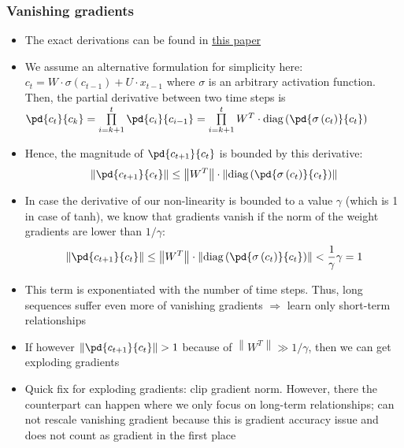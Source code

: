 \subsubsection{Vanishing gradients}
\begin{itemize}
	\item The exact derivations can be found in \href{http://proceedings.mlr.press/v28/pascanu13.pdf}{this paper}
	\item We assume an alternative formulation for simplicity here: $c_t = W \cdot \sigma(c_{t-1}) + U \cdot x_{t-1}$ where $\sigma$ is an arbitrary activation function. Then, the partial derivative between two time steps is\\ $\pd{c_{t}}{c_{k}} = \prod\limits_{i=k+1}^{t} \pd{c_{i}}{c_{i-1}} = \prod\limits_{i=k+1}^{t} W^T \cdot \text{diag}\left(\pd{\sigma\left(c_t\right)}{c_t}\right)$
	\item Hence, the magnitude of $\pd{c_{t+1}}{c_{t}}$ is bounded by this derivative: 
	$$\left\lVert \pd{c_{t+1}}{c_{t}}\right\rVert \leq \left\lVert W^T\right\rVert \cdot \left\lVert \text{diag}\left(\pd{\sigma\left(c_t\right)}{c_t}\right)\right\rVert$$
	\item In case the derivative of our non-linearity is bounded to a value $\gamma$ (which is 1 in case of tanh), we know that gradients vanish if the norm of the weight gradients are lower than $1/\gamma$:
	$$\left\lVert \pd{c_{t+1}}{c_{t}}\right\rVert \leq \left\lVert W^T\right\rVert \cdot \left\lVert \text{diag}\left(\pd{\sigma\left(c_t\right)}{c_t}\right)\right\rVert < \frac{1}{\gamma}\gamma = 1$$
	\item This term is exponentiated with the number of time steps. Thus, long sequences suffer even more of vanishing gradients $\Rightarrow$ learn only short-term relationships
	\item If however $\left\lVert \pd{c_{t+1}}{c_{t}}\right\rVert > 1$ because of $\left\lVert W^T\right\rVert \gg 1/\gamma$, then we can get exploding gradients
	\item Quick fix for exploding gradients: clip gradient norm. However, there the counterpart can happen where we only focus on long-term relationships; can not rescale vanishing gradient because this is gradient accuracy issue and does not count as gradient in the first place
\end{itemize}
